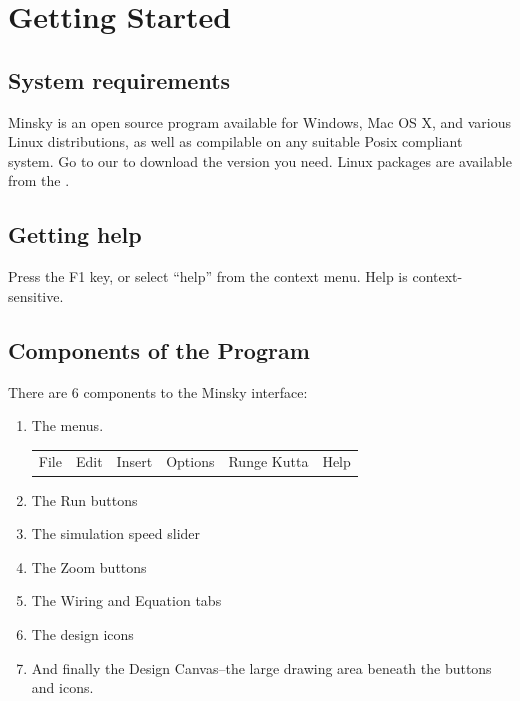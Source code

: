 \chapter{Getting Started}

\section{System requirements}

Minsky is an open source program available for Windows, Mac OS X,
and various Linux distributions, as well as compilable on any suitable
Posix compliant system. Go to our  to download the version you need. Linux
packages are available from the .

\section{Getting help}

Press the F1 key, or select ``help'' from the context menu. Help is
context-sensitive.


\section{Components of the Program}

There are 6 components to the Minsky interface:

\begin{enumerate}
\item  The menus.

  \begin{tabular}{llllll}
    File & Edit & Insert & Options & Runge Kutta & Help \\
  \end{tabular}

\item  The Run buttons


\item The simulation speed slider



\item The Zoom buttons


\item The Wiring and Equation tabs


\item The design icons



\item And finally the Design Canvas--the large drawing area beneath the buttons and icons.

\end{enumerate}

